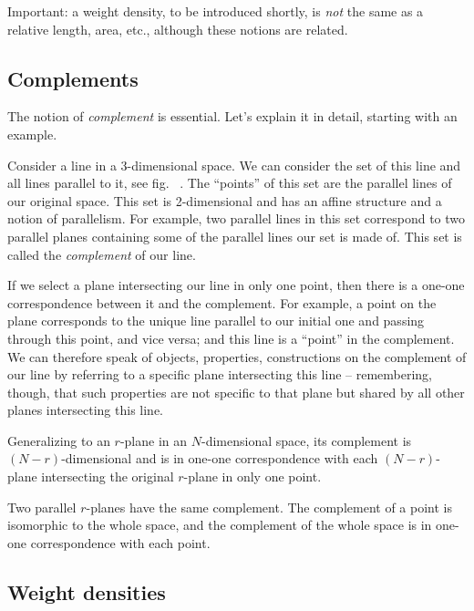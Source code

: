 \documentclass[\ifafour a4paper,12pt,\else a5paper,10pt,\fi%
onecolumn,oneside,article,%
british%
]{memoir}
\theoremstyle{remark}
\theoremstyle{innote}
\renewcommand*{\|}{\nonscript\,\vert\nonscript\;\mathopen{}}
\newcommand*{\fig}{fig.}%
\newcommand*{\etc}{{etc.}}
\newcommand*{\puzzle}{{\fontencoding{U}\fontfamily{fontawesometwo}\selectfont\symbol{225}}}
\newcommand{\mynote}[1]{ {\color{notecolour}\puzzle\ #1}}
\newcommand*{\yr}{r}
\newcommand*{\yN}{N}
\begin{document}
Important: a weight density, to be introduced shortly, is \emph{not} the
same as a relative length, area, \etc, although these notions are related.

\subsection{Complements}
\label{sec:complements}

The notion of \emph{complement} is essential. Let's explain it in detail,
starting with an example.

Consider a line in a 3-dimensional space. We can consider the set of this
line and all lines parallel to it, see \fig\mynote{}. The \enquote{points} of
this set are the parallel lines of our original space. This set is
2-dimensional and has an affine structure and a notion of parallelism. For
example, two parallel lines in this set correspond to two parallel planes
containing some of the parallel lines our set is made of. This set is
called the \emph{complement} of our line.

If we select a plane intersecting our line in only one point, then there is
a one-one correspondence between it and the complement. For example, a
point on the plane corresponds to the unique line parallel to our initial
one and passing through this point, and vice versa; and this line is a
\enquote{point} in the complement. We can therefore speak of objects,
properties, constructions on the complement of our line by referring to a
specific plane intersecting this line -- remembering, though, that such
properties are not specific to that plane but shared by all other planes
intersecting this line.

Generalizing to an $\yr$-plane in an $\yN$-dimensional space, its
complement is $(\yN-\yr)$-dimensional and is in one-one correspondence with
each $(\yN-\yr)$-plane intersecting the original $\yr$-plane in only one
point.

Two parallel $\yr$-planes have the same complement. The complement of a
point is isomorphic to the whole space, and the complement of the whole
space is in one-one correspondence with each point.




\subsection{Weight densities}
\label{sec:weight_densities}
\end{document}
